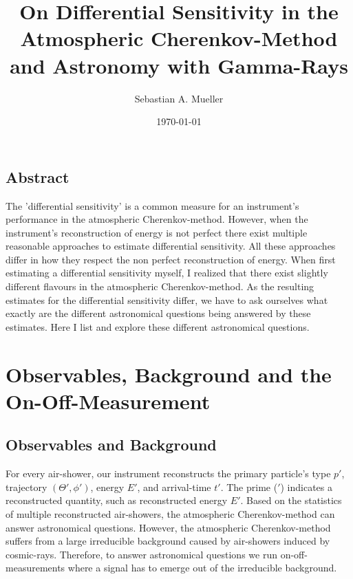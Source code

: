 \documentclass{article}%
\title{
    On Differential Sensitivity in the Atmospheric Cherenkov-Method and Astronomy with Gamma-Rays
}%
\author{Sebastian A. Mueller}%
\date{\today{}}%
\begin{document}
%
    \maketitle%
    \newcommand{\dd}[2]{\frac{\mathrm{d}#1}{\mathrm{d}#2}}
    \subsection*{Abstract}
        The 'differential sensitivity' is a common measure for an instrument's performance in the atmospheric Cherenkov-method.
        However, when the instrument's reconstruction of energy is not perfect there exist multiple reasonable approaches to estimate differential sensitivity.
        All these approaches differ in how they respect the non perfect reconstruction of energy.
        When first estimating a differential sensitivity myself, I realized that there exist slightly different flavours in the atmospheric Cherenkov-method.
        As the resulting estimates for the differential sensitivity differ, we have to ask ourselves what exactly are the different astronomical questions being answered by these estimates.
        Here I list and explore these different astronomical questions.
    \section{Observables, Background and the On-Off-Measurement}
        \label{SecObservablesAndOnOff}
        \subsection*{Observables and Background}
            For every air-shower, our instrument reconstructs the primary particle's type $p'$, trajectory $(\Theta', \phi')$, energy $E'$, and arrival-time $t'$.
            The prime ($'$) indicates a reconstructed quantity, such as reconstructed energy $E'$.
            Based on the statistics of multiple reconstructed air-showers, the atmospheric Cherenkov-method can answer astronomical questions.
            However, the atmospheric Cherenkov-method suffers from a large irreducible background caused by air-showers induced by cosmic-rays.
            Therefore, to answer astronomical questions we run on-off-measurements where a signal has to emerge out of the irreducible background.
\end{document}

